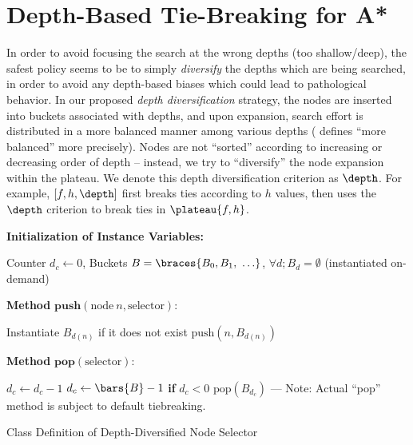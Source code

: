 \section{Depth-Based Tie-Breaking for A*}

In order to avoid focusing the search at the wrong depths (too shallow/deep), 
the safest policy seems to be to simply \emph{diversify} the depths which are being searched,
in order to avoid any depth-based biases which could lead to pathological behavior.
In our proposed \emph{depth diversification} strategy, the nodes are inserted into buckets
associated with depths, and upon expansion, search effort is distributed in a more balanced manner
among various depths ( defines ``more balanced''  more precisely).
Nodes are not  ``sorted''
according to increasing or decreasing order of depth -- instead, we try to 
``diversify'' the node expansion within the plateau.
We denote this depth diversification criterion as $\depth$. 
For example, $[f,h,\depth]$ first breaks ties according to $h$ values,
then uses the $\depth$ criterion to break ties in $\plateau{f,h}$.

\begin{algorithm}
 \textbf{Initialization of Instance Variables:}
\begin{algorithmic}
 \STATE Counter $d_c\leftarrow 0$, Buckets $B=\braces{B_0, B_1,\ \ldots}$, $\forall d; B_d=\emptyset$ (instantiated on-demand)
\end{algorithmic}
 \textbf{Method} $\textbf{push}(\text{node}\ n,\text{selector})$:
\begin{algorithmic}
 \STATE Instantiate $B_{d(n)}$ if it does not exist
 \STATE $\text{push}(n, B_{d(n)})$
\end{algorithmic}
 \textbf{Method} $\textbf{pop}(\text{selector})$:
\begin{algorithmic}[1]
 \LOOP
 \STATE $d_c\leftarrow d_c-1$
 \STATE $d_c\leftarrow \bars{B}-1$ \textbf{if} $d_c<0$
 \RETURN $\text{pop}(B_{d_c})$ --- Note: Actual ``pop'' method is subject to default tiebreaking.
 \ENDIF
 \ENDLOOP
\end{algorithmic}
\caption{Class Definition of Depth-Diversified Node Selector}
\label{alg:depth}
\end{algorithm}

